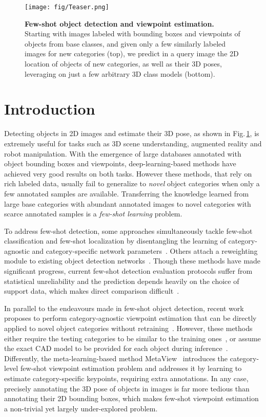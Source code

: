 \documentclass[runningheads]{llncs}
\begin{document}
\begin{figure}[t]
    \centering
    \texttt{[image: fig/Teaser.png]}
    \caption{\textbf{Few-shot object detection and viewpoint estimation.} 
    Starting with images labeled with bounding boxes and viewpoints of objects from base classes, and given only a few similarly labeled images for new categories (top), we predict in a query image the 2D location of objects of new categories, as well as their 3D poses, leveraging on just a few arbitrary 3D class models (bottom).}
    \label{fig:teaser}
\end{figure}


\section{Introduction}

Detecting objects in 2D images and estimate their 3D pose, as shown in Fig.\,\ref{fig:teaser}, is extremely useful for tasks such as 3D scene understanding, augmented reality and robot manipulation. With the emergence of large databases annotated with object bounding boxes and viewpoints, deep-learning-based methods have achieved very good results on both tasks. 
However these methods, that rely on rich labeled data, usually fail to generalize to \emph{novel} object categories when only a few annotated samples are available.
Transferring the knowledge learned from large base categories with abundant annotated images to novel categories with scarce annotated samples is a \emph{few-shot learning} problem.


To address few-shot detection, some approaches simultaneously tackle few-shot classification and few-shot localization by disentangling the learning of category-agnostic and category-specific network parameters~\cite{MetaDet2019}. 
Others attach a reweighting module to existing object detection networks~\cite{YOLO-FS2019,metarcnn2019}.
Though these methods have made significant progress, current few-shot detection evaluation protocols suffer from statistical unreliability and the prediction depends heavily on the choice of support data, which makes direct comparison difficult~\cite{wang2020few}.

In parallel to the endeavours made in few-shot object detection, recent work proposes to perform category-agnostic viewpoint estimation that can be directly applied to novel object categories without retraining~\cite{starmap2018,Xiao2019PoseFromShape}.
However, these methods either require the testing categories to be similar to the training ones~\cite{starmap2018}, or assume the exact CAD model to be provided for each object during inference~\cite{Xiao2019PoseFromShape}.
Differently, the meta-learning-based method MetaView~\cite{Tseng2019FewShotVE} introduces the category-level few-shot viewpoint estimation problem and addresses it by learning to estimate category-specific keypoints, requiring extra annotations. 
In any case, precisely annotating the 3D pose of objects in images is far more tedious than annotating their 2D bounding boxes, which makes few-shot viewpoint estimation a non-trivial yet largely under-explored problem.
\end{document}
